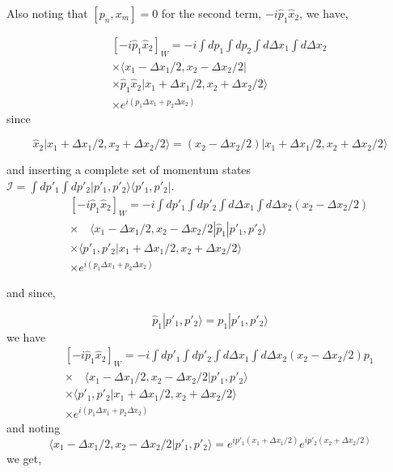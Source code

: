 \documentclass[phd,tocprelim]{cornell}
\begin{document}
Also noting that $[p_n,x_m]=0$ for the second term, $-i\hat{p}_1\hat{x}_2$, we have,

\begin{eqnarray}
&&[-i\hat{p}_1\hat{x}_2]_W=  -i\int dp_1 \int dp_2  \int d \Delta x_1 \int d \Delta x_2  \\ 
\nonumber
&& \times
\langle {x}_1-\Delta {x}_{1}/{2},{x}_2-\Delta {x}_{2}/{2} |  \\ 
\nonumber
&& \times
\hat{p}_1\hat{x}_2| {x}_1+\Delta {x}_{1}/{2},{x}_2+\Delta {x}_{2}/{2} \rangle
\\ 
\nonumber
&& \times
 e^{i(p_1\Delta x_1+p_2\Delta x_2)}
\end{eqnarray}
since 

\begin{equation}
\hat{x}_2| {x}_1+\Delta {x}_{1}/{2},{x}_2+\Delta {x}_{2}/{2} \rangle=({x}_2-\Delta {x}_{2}/{2})| {x}_1+\Delta {x}_{1}/{2},{x}_2+\Delta {x}_{2}/{2} \rangle
\end{equation}

and inserting a complete set of momentum states $\mathcal{I}=\int dp'_1 \int dp'_2 |p'_1, p'_2\rangle \langle p'_1, p'_2 |$. 
\begin{eqnarray}
&&[-i\hat{p}_1\hat{x}_2]_W=  -i\int dp'_1 \int dp'_2  \int d \Delta x_1 \int d \Delta x_2  ({x}_2-\Delta {x}_{2}/{2})\\ 
\nonumber
&& \times
\quad\langle {x}_1-\Delta {x}_{1}/{2},{x}_2-\Delta {x}_{2}/{2} |\hat{p}_1 |p'_1, p'_2\rangle \\ 
\nonumber
&& \times
 \langle p'_1, p'_2 | {x}_1+\Delta {x}_{1}/{2},{x}_2+\Delta {x}_{2}/{2} \rangle \\ 
\nonumber
&& \times
  e^{i(p_1\Delta x_1+p_2\Delta x_2)}
\end{eqnarray}

and since, 




\begin{equation}
\hat{p}_1 |p'_1, p'_2\rangle={p}_1 |p'_1, p'_2\rangle
\end{equation}
we have 
\begin{eqnarray}
&&[-i\hat{p}_1\hat{x}_2]_W=  -i\int dp'_1 \int dp'_2  \int d \Delta x_1 \int d \Delta x_2  ({x}_2-\Delta {x}_{2}/{2})p_1\\ 
\nonumber
&& \times
\quad\langle {x}_1-\Delta {x}_{1}/{2},{x}_2-\Delta {x}_{2}/{2} |p'_1, p'_2\rangle \\ 
\nonumber
&& \times
 \langle p'_1, p'_2 | {x}_1+\Delta {x}_{1}/{2},{x}_2+\Delta {x}_{2}/{2} \rangle  \\ 
\nonumber
&& \times
 e^{i(p_1\Delta x_1+p_2\Delta x_2)}
\end{eqnarray}
and noting 
\begin{equation}
\langle {x}_1-\Delta {x}_{1}/{2},{x}_2-\Delta {x}_{2}/{2} |p'_1, p'_2\rangle =e^{ip'_1({x}_1+\Delta {x}_{1}/{2})}e^{ip'_2({x}_2+\Delta {x}_{2}/{2})}
\end{equation}
 we get, 
\end{document}
